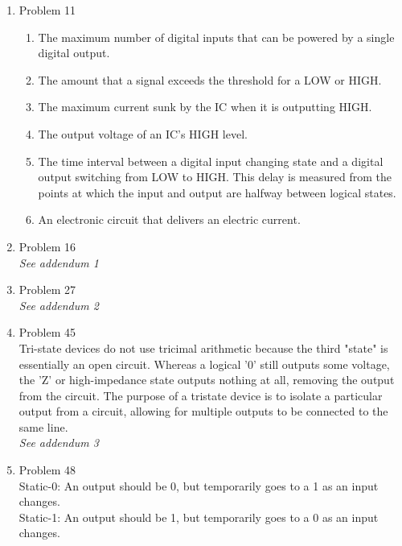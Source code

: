 \begin{enumerate}[leftmargin=2cm,labelsep=.5cm,label=\bf\arabic*.]

\item Problem 11
\begin{enumerate}
  \item The maximum number of digital inputs that can be powered by a single digital output.
  \item The amount that a signal exceeds the threshold for a LOW or HIGH. 
  \item The maximum current sunk by the IC when it is outputting HIGH.
  \item The output voltage of an IC's HIGH level.
  \item The time interval between a digital input changing state and a digital output switching from LOW to HIGH. This delay is measured from the points at which the input and output are halfway between logical states.
  \item An electronic circuit that delivers an electric current. 
\end{enumerate}

\item Problem 16 \\
\emph{See addendum 1}

\item Problem 27 \\
\emph{See addendum 2}

\item Problem 45 \\
Tri-state devices do not use tricimal arithmetic because the third "state" is essentially an open circuit. Whereas a logical '0' still outputs some voltage, the 'Z' or high-impedance state outputs nothing at all, removing the output from the circuit. The purpose of a tristate device is to isolate a particular output from a circuit, allowing for multiple outputs to be connected to the same line. \\
\emph{See addendum 3}

\item Problem 48 \\
Static-0: An output should be 0, but temporarily goes to a 1 as an input changes. \\
Static-1: An output should be 1, but temporarily goes to a 0 as an input changes.

\end{enumerate}
